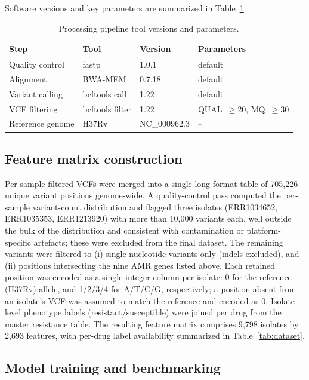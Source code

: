 Software versions and key parameters are summarized in Table~\ref{tab:tools}.

\begin{table}[t]
\centering
\caption{Processing pipeline tool versions and parameters.}
\label{tab:tools}
\begin{tabular}{llll}
\toprule
Step & Tool & Version & Parameters \\
\midrule
Quality control  & fastp          & 1.0.1 & default \\
Alignment        & BWA-MEM        & 0.7.18 & default \\
Variant calling   & bcftools call  & 1.22 & default \\
VCF filtering     & bcftools filter & 1.22 & QUAL~$\geq20$, MQ~$\geq30$ \\
Reference genome  & H37Rv          & NC\_000962.3 & -- \\
\bottomrule
\end{tabular}
\end{table}

\subsection{Feature matrix construction}

Per-sample filtered VCFs were merged into a single long-format table of 705{,}226 unique variant positions genome-wide. A quality-control pass computed the per-sample variant-count distribution and flagged three isolates (ERR1034652, ERR1035353, ERR1213920) with more than 10{,}000 variants each, well outside the bulk of the distribution and consistent with contamination or platform-specific artefacts; these were excluded from the final dataset. The remaining variants were filtered to (i) single-nucleotide variants only (indels excluded), and (ii) positions intersecting the nine AMR genes listed above. Each retained position was encoded as a single integer column per isolate: 0 for the reference (H37Rv) allele, and 1/2/3/4 for A/T/C/G, respectively; a position absent from an isolate's VCF was assumed to match the reference and encoded as 0. Isolate-level phenotype labels (resistant/susceptible) were joined per drug from the master resistance table. The resulting feature matrix comprises 9{,}798 isolates by 2{,}693 features, with per-drug label availability summarized in Table~\ref{tab:dataset}.

\subsection{Model training and benchmarking}

